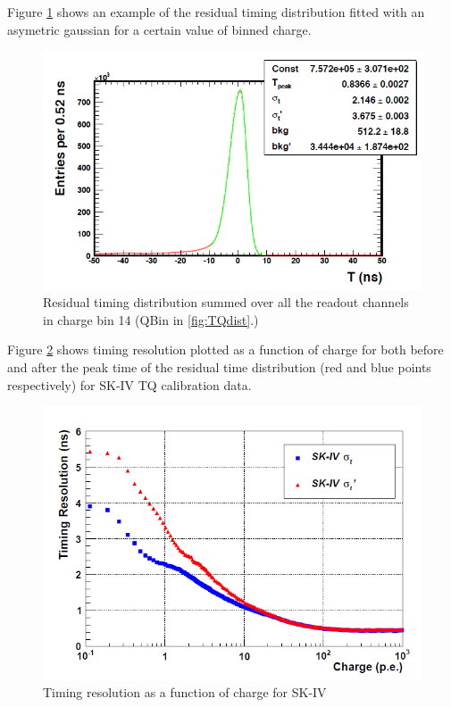 Figure \ref{fig:asygausst} shows an example of the residual timing distribution fitted with an asymetric gaussian for a certain value of binned charge.

\begin{figure}
    \includegraphics[width=\textwidth]{Figures/asygausst.png}
\caption{Residual timing distribution summed over all the readout channels in charge bin 14 (QBin in \ref{fig:TQdist}.)}
    \label{fig:asygausst}
\end{figure}



Figure \ref{fig:resolutiont} shows timing resolution  plotted as a function of charge for both before and after the peak time of the residual time distribution (red and blue points respectively) for SK-IV TQ calibration data. 

\begin{figure}
    \includegraphics[width=\textwidth]{Figures/resolutiont.png}
\caption{Timing resolution as a function of charge for SK-IV}
    \label{fig:resolutiont}
\end{figure}

